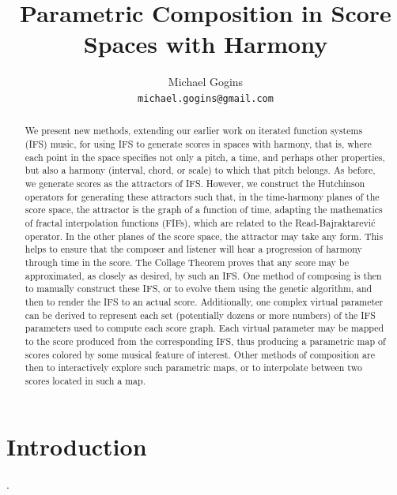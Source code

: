 \documentclass[english,11pt,letterpaper,onecolumn]{scrartcl}
\numberwithin{equation}{section}
\begin{document}
\title{Parametric Composition in Score Spaces with Harmony} \author{Michael
Gogins \\ \texttt{michael.gogins@gmail.com}} \maketitle

\begin{abstract}
We present new methods, extending our earlier work on iterated function systems
(IFS) music, for using IFS to generate scores in spaces with harmony, that is,
where each point in the space specifies not only a pitch, a time, and perhaps
other properties, but also a harmony (interval, chord, or scale) to which that
pitch belongs. As before, we generate scores as the attractors of IFS. However,
we construct the Hutchinson operators for generating these attractors such that,
in the time-harmony planes of the score space, the attractor is the graph of a
function of time, adapting the mathematics of fractal interpolation functions
(FIFs), which are related to the Read-Bajraktarevi\'c operator. In the other
planes of the score space, the attractor may take any form. This helps to ensure
that the composer and listener will hear a progression of harmony through time
in the score. The Collage Theorem proves that any score may be approximated, as
closely as desired, by such an IFS. One method of composing is then to manually
construct these IFS, or to evolve them using the genetic algorithm, and then to
render the IFS to an actual score. Additionally, one complex virtual parameter
can be derived to represent each set (potentially dozens or more numbers) of the
IFS parameters used to compute each score graph. Each virtual parameter may be
mapped to the score produced from the corresponding IFS, thus producing a
parametric map of scores colored by some musical feature of interest. Other
methods of composition are then to interactively explore such parametric maps,
or to interpolate between two scores located in such a map.
\end{abstract}


\section{Introduction}

.
\end{document}
